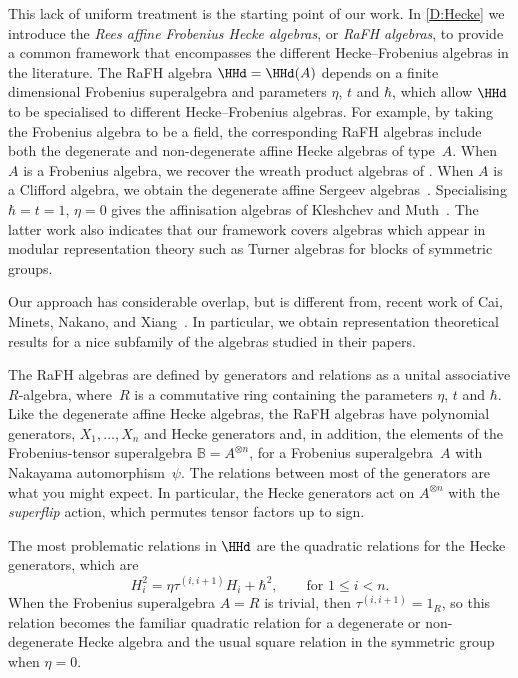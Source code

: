 \documentclass[a4paper,11pt]{amsart}
\numberwithin{equation}{subsection}
\theoremstyle{definition}
\theoremstyle{theorem}
\theoremstyle{remark}
\newcommand{\Bo}{\mathbb{B}}
\begin{document}
This lack of uniform treatment is the starting point of our work. In \autoref{D:Hecke} we
introduce the \emph{Rees affine Frobenius Hecke algebras}, or \emph{RaFH
algebras}, to provide a common framework that encompasses the different
Hecke--Frobenius algebras in the literature. The RaFH algebra
$\HHd=\HHd(A)$ depends on a finite dimensional Frobenius superalgebra
and parameters $\eta$, $t$ and $\hbar$, which allow $\HHd$ to be
specialised to different Hecke--Frobenius algebras. For example, by
taking the Frobenius algebra to be a field, the corresponding RaFH
algebras include both the degenerate and non-degenerate affine Hecke
algebras of type~$A$. When $A$ is a Frobenius algebra, we recover the
wreath product algebras of
\cite{Savage:AffineWreath,RossoSavage:QuantumAffineWreath}. When $A$ is
a Clifford algebra, we obtain the degenerate affine Sergeev
algebras~\cite{Sergeev, Nazarov}. Specialising $\hbar=t=1$, $\eta=0$ gives the affinisation algebras of  Kleshchev and Muth~\cite{KleshchevMuth}. The latter work also indicates that our framework covers algebras which appear in modular representation theory such as Turner algebras for blocks of symmetric groups.

Our approach has considerable overlap, but is
different from, recent work of Cai, Minets, Nakano, and
Xiang~\cite{LaiMinets,MinetsYBE,CJNakanoXiang}. In particular, we obtain representation theoretical results for a nice subfamily of the algebras studied in their papers.

The RaFH algebras are defined by generators and relations as a unital
associative $R$-algebra, where~$R$ is a commutative ring containing the
parameters $\eta$, $t$ and $\hbar$. Like the degenerate affine Hecke algebras, the
RaFH algebras have polynomial generators, $X_1,\dots,X_n$ and Hecke
generators and, in addition, the elements of the Frobenius-tensor superalgebra $\Bo=A^{\otimes n}$,
for a Frobenius superalgebra~$A$ with Nakayama automorphism~$\psi$. The
relations between most of the generators are what you might expect. In
particular, the Hecke generators act on $A^{\otimes n}$ with the
\emph{superflip} action, which permutes tensor factors up to sign.

The most problematic relations in $\HHd$ are the quadratic
relations for the Hecke generators, which are
\[
     H_i^2 = \eta\tau^{(i,i+1)}H_i+\hbar^2,\qquad\text{for }1\le i<n.
\]
When the Frobenius superalgebra $A=R$ is trivial, then
$\tau^{(i,i+1)}=1_R$, so this relation becomes the familiar quadratic
relation for a degenerate or non-degenerate Hecke algebra and the usual square relation in the symmetric group when $\eta=0$.
\end{document}
